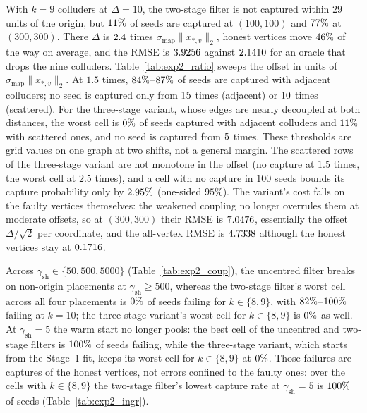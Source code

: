 \documentclass[11pt,a4paper]{article}
\theoremstyle{definition}
\theoremstyle{remark}
\begin{document}
With $k=9$ colluders at $\Delta = 10$, the two-stage filter is not captured within $29$ units of the origin, but $11\%$ of seeds are captured at $(100,100)$ and $77\%$ at $(300,300)$. There $\Delta$ is $2.4$ times $\sigma_{\mathrm{map}}\|x_{*,v}\|_2$, honest vertices move $46\%$ of the way on average, and the RMSE is $3.9256$ against $2.1410$ for an oracle that drops the nine colluders. Table~\ref{tab:exp2_ratio} sweeps the offset in units of $\sigma_{\mathrm{map}}\|x_{*,v}\|_2$. At $1.5$ times, $84\%$--$87\%$ of seeds are captured with adjacent colluders; no seed is captured only from $15$ times (adjacent) or $10$ times (scattered). For the three-stage variant, whose edges are nearly decoupled at both distances, the worst cell is $0\%$ of seeds captured with adjacent colluders and $11\%$ with scattered ones, and no seed is captured from $5$ times. These thresholds are grid values on one graph at two shifts, not a general margin. The scattered rows of the three-stage variant are not monotone in the offset (no capture at $1.5$ times, the worst cell at $2.5$ times), and a cell with no capture in $100$ seeds bounds its capture probability only by $2.95\%$ (one-sided $95\%$). The variant's cost falls on the faulty vertices themselves: the weakened coupling no longer overrules them at moderate offsets, so at $(300,300)$ their RMSE is $7.0476$, essentially the offset $\Delta/\sqrt{2}$ per coordinate, and the all-vertex RMSE is $4.7338$ although the honest vertices stay at $0.1716$.

Across $\gamma_{\mathrm{sh}} \in \{50, 500, 5000\}$ (Table~\ref{tab:exp2_coup}), the uncentred filter breaks on non-origin placements at $\gamma_{\mathrm{sh}} \ge 500$, whereas the two-stage filter's worst cell across all four placements is $0\%$ of seeds failing for $k \in \{8, 9\}$, with $82\%$--$100\%$ failing at $k = 10$; the three-stage variant's worst cell for $k \in \{8, 9\}$ is $0\%$ as well. At $\gamma_{\mathrm{sh}} = 5$ the warm start no longer pools: the best cell of the uncentred and two-stage filters is $100\%$ of seeds failing, while the three-stage variant, which starts from the Stage~1 fit, keeps its worst cell for $k \in \{8, 9\}$ at $0\%$. Those failures are captures of the honest vertices, not errors confined to the faulty ones: over the cells with $k \in \{8, 9\}$ the two-stage filter's lowest capture rate at $\gamma_{\mathrm{sh}} = 5$ is $100\%$ of seeds (Table~\ref{tab:exp2_ingr}).
\end{document}
